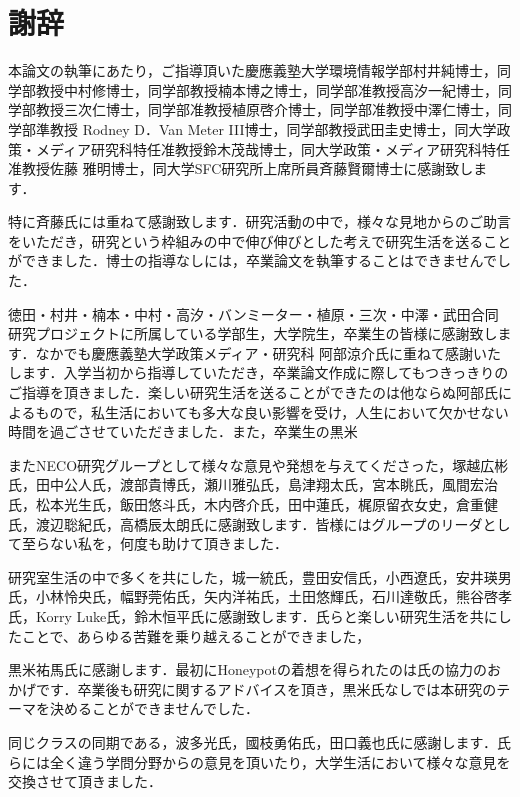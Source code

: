 \chapter*{謝辞}
\label{thanks}


本論文の執筆にあたり，ご指導頂いた慶應義塾大学環境情報学部村井純博士，同学部教授中村修博士，同学部教授楠本博之博士，同学部准教授高汐一紀博士，同学部教授三次仁博士，同学部准教授植原啓介博士，同学部准教授中澤仁博士，同学部準教授 Rodney D．Van Meter III博士，同学部教授武田圭史博士，同大学政策・メディア研究科特任准教授鈴木茂哉博士，同大学政策・メディア研究科特任准教授佐藤 雅明博士，同大学SFC研究所上席所員斉藤賢爾博士に感謝致します．


特に斉藤氏には重ねて感謝致します．研究活動の中で，様々な見地からのご助言をいただき，研究という枠組みの中で伸び伸びとした考えで研究生活を送ることができました．博士の指導なしには，卒業論文を執筆することはできませんでした．


徳田・村井・楠本・中村・高汐・バンミーター・植原・三次・中澤・武田合同研究プロジェクトに所属している学部生，大学院生，卒業生の皆様に感謝致します．なかでも慶應義塾大学政策メディア・研究科 阿部涼介氏に重ねて感謝いたします．入学当初から指導していただき，卒業論文作成に際してもつきっきりのご指導を頂きました．楽しい研究生活を送ることができたのは他ならぬ阿部氏によるもので，私生活においても多大な良い影響を受け，人生において欠かせない時間を過ごさせていただきました．また，卒業生の黒米


またNECO研究グループとして様々な意見や発想を与えてくださった，塚越広彬氏，田中公人氏，渡部貴博氏，瀬川雅弘氏，島津翔太氏，宮本眺氏，風間宏治氏，松本光生氏，飯田悠斗氏，木内啓介氏，田中蓮氏，梶原留衣女史，倉重健氏，渡辺聡紀氏，高橋辰太朗氏に感謝致します．皆様にはグループのリーダとして至らない私を，何度も助けて頂きました．


研究室生活の中で多くを共にした，城一統氏，豊田安信氏，小西遼氏，安井瑛男氏，小林怜央氏，幅野莞佑氏，矢内洋祐氏，土田悠輝氏，石川達敬氏，熊谷啓孝氏，Korry Luke氏，鈴木恒平氏に感謝致します．氏らと楽しい研究生活を共にしたことで、あらゆる苦難を乗り越えることができました，

黒米祐馬氏に感謝します．最初にHoneypotの着想を得られたのは氏の協力のおかげです．卒業後も研究に関するアドバイスを頂き，黒米氏なしでは本研究のテーマを決めることができませんでした．

同じクラスの同期である，波多光氏，國枝勇佑氏，田口義也氏に感謝します．氏らには全く違う学問分野からの意見を頂いたり，大学生活において様々な意見を交換させて頂きました．

